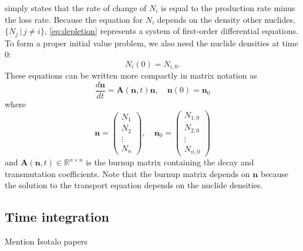 \documentclass[3p,authoryear]{elsarticle}
\begin{document}
 simply states that the rate of change of $N_i$ is equal to
the production rate minus the loss rate. Because the equation for $N_i$ depends
on the density other nuclides, $\{N_j \,|\, j \ne i\}$, \cref{eq:depletion}
represents a system of first-order differential equations. To form a proper
initial value problem, we also need the nuclide densities at time 0:
\begin{equation}
    N_i(0) = N_{i,0}.
\end{equation}
These equations can be written more compactly in matrix notation as
\begin{equation}
  \label{eq:depletion-matrix}
  \frac{d\mathbf{n}}{dt} = \mathbf{A}(\mathbf{n},t)\mathbf{n}, \quad \mathbf{n}(0) =
  \mathbf{n}_0
\end{equation}
where
\begin{equation}
  \mathbf{n} = \begin{pmatrix} N_1 \\ N_2 \\ \vdots \\ N_n \end{pmatrix}, \quad
  \mathbf{n}_0 = \begin{pmatrix} N_{1,0} \\ N_{2,0} \\ \vdots \\ N_{n,0} \end{pmatrix}
\end{equation}
and $\mathbf{A}(\mathbf{n},t) \in \mathbb{R}^{n\times n}$ is the burnup matrix
containing the decay and transmutation coefficients. Note that the burnup matrix
depends on $\mathbf{n}$ because the solution to the transport equation depends
on the nuclide densities.

\subsection{Time integration}
\label{sec:time_integration}

Mention Isotalo papers
\end{document}
